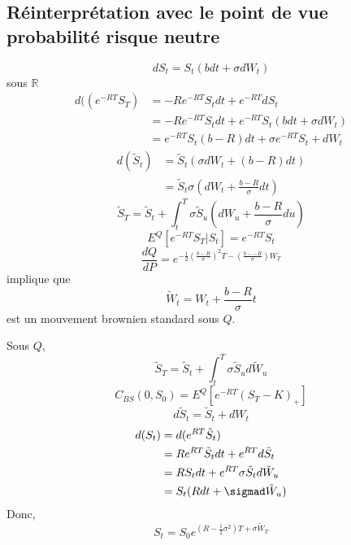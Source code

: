 \documentclass{article}
\theoremstyle{plain}
\theoremstyle{definition}
\begin{document}
\subsection{R\'einterpr\'etation avec le point de vue probabilit\'e risque neutre}

\begin{equation}
dS_t=S_t(bdt+\sigma dW_t)
\end{equation}
sous $\mathbb{R}$
\begin{equation}
\begin{split}
d((e^{-RT}S_T)&=-Re^{-RT}S_tdt+e^{-RT}dS_t\\
&=-Re^{-RT}S_tdt+e^{-RT}S_t(bdt+\sigma dW_t)\\
&=e^{-RT}S_t(b-R)dt+\sigma e^{-RT}S_t+d W_t
\end{split}
\end{equation}
\begin{equation}
\begin{split}
d(\tilde{S}_t)&=\tilde{S}_t(\sigma dW_t+(b-R)dt)\\
&=\tilde{S}_t\sigma (dW_t+\frac{b-R}{\sigma}dt)
\end{split}
\end{equation}
\begin{equation}
\tilde{S}_T=\tilde{S}_t+\int_t^T\sigma\tilde{S}_u(dW_u+\frac{b-R}{\sigma}du)
\end{equation}
\begin{equation}
E^Q[e^{-RT}S_T|S_t]=e^{-RT}S_t
\end{equation}
\begin{equation}
\frac{dQ}{dP}=e^{-\frac{1}{2}(\frac{b-R}{\sigma})^2T-(\frac{b--R}{\sigma})W_T}
\end{equation}
implique que 
\begin{equation}
\tilde{W}_t=W_t+\frac{b-R}{\sigma}t
\end{equation}
 est un mouvement brownien standard sous $Q$.
 
 Sous $Q$,
\begin{equation}
\tilde{S}_T=\tilde{S}_t+\int_t^T\sigma\tilde{S}_ud\tilde{W}_u
\end{equation}
\begin{equation}
C_{BS}(0,S_0)=E^Q[e^{-RT}(S_T-K)_+]
\end{equation}
\begin{equation}
d\tilde{S}_t=\tilde{S}_t+dW_t
\end{equation}
\begin{equation}
\begin{split}
d(S_t)&=d(e^{RT}\tilde{S}_t)\\
&=Re^{RT}\tilde{S}_tdt+e^{RT}d\tilde{S}_t\\
&=RS_tdt+e^{RT}\sigma\tilde{S}_td\tilde{W}_u\\
&=S_t(Rdt+\sigmad\tilde{W}_u)
\end{split}
\end{equation}
Donc,
\begin{equation}
S_t=S_0e^{(R-\frac{1}{2}\sigma^2)T+\sigma\tilde{W}_T}
\end{equation}
\end{document}
